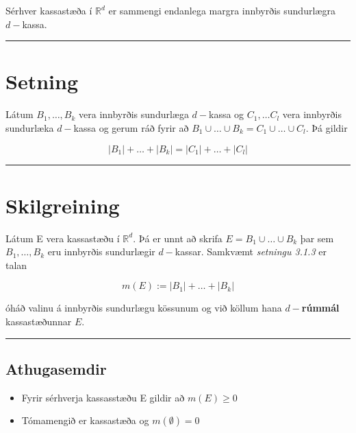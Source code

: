 \documentclass[]{book}
\begin{document}
Sérhver kassastæða í \(\mathbb R^d\) er sammengi endanlega margra innbyrðis sundurlægra \(d-\)kassa.

\begin{center}\rule{0.5\linewidth}{\linethickness}\end{center}

\hypertarget{setning-9}{%
\section{Setning}\label{setning-9}}

Látum \(B_1, \dots, B_k\) vera innbyrðis sundurlæga \(d-\)kassa og \(C_1, \dots C_l\) vera innbyrðis sundurlæka \(d-\)kassa og gerum ráð fyrir að \(B_1 \cup \dots \cup B_k = C_1 \cup \dots \cup C_l\). Þá gildir

\[
|B_1| + \dots + |B_k| = |C_1| + \dots + |C_l|
\]

\begin{center}\rule{0.5\linewidth}{\linethickness}\end{center}

\hypertarget{skilgreining-1}{%
\section{Skilgreining}\label{skilgreining-1}}

Látum E vera kassastæðu í \(\mathbb R^d\). Þá er unnt að skrifa \(E = B_1 \cup \dots \cup B_k\) þar sem \(B_1, \dots, B_k\) eru innbyrðis sundurlægir \(d-\)kassar. Samkvæmt \emph{setningu 3.1.3} er talan

\[
m(E) := |B_1| + \dots + |B_k|
\]

óháð valinu á innbyrðis sundurlægu kössunum og við köllum hana \(d-\)\textbf{rúmmál} kassastæðunnar \(E\).

\begin{center}\rule{0.5\linewidth}{\linethickness}\end{center}

\hypertarget{athugasemdir}{%
\subsection{Athugasemdir}\label{athugasemdir}}

\begin{itemize}
\item
  Fyrir sérhverja kassasstæðu E gildir að \(m(E) \geq 0\)
\item
  Tómamengið er kassastæða og \(m(\emptyset) = 0\)
\end{itemize}
\end{document}
